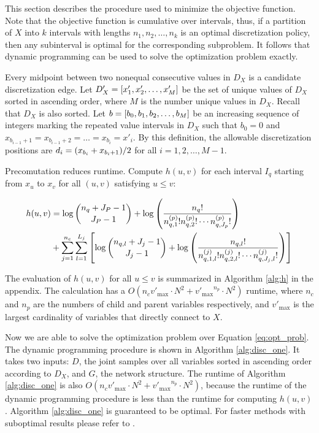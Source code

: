 This section describes the procedure used to minimize the objective function.
Note that the objective function is cumulative over intervals, thus, if a partition of $X$ into $k$ intervals with lengths $n_1,n_2,\ldots,n_k$ is an optimal discretization policy, then any subinterval is optimal for the corresponding subproblem.
It follows that dynamic programming can be used to solve the optimization problem exactly.

Every midpoint between two nonequal consecutive values in $D_X$ is a candidate discretization edge.
Let ${D'_X} = \brock{x'_1,x'_2,\ldots,x'_M}$ be the set of unique values of $D_X$ sorted in ascending order, where $M$ is the number unique values in $D_X$.
Recall that $D_X$ is also sorted.
Let $b = \brock{b_0,b_1,b_2,\ldots,b_M}$ be an increasing sequence of integers marking the repeated value intervals in $D_X$ such that $b_0 = 0$ and $x_{b_{i-1} + 1} = x_{b_{i-1} + 2} = \ldots = x_{b_i} = x'_i$.
By this definition, the allowable discretization positions are $d_i = \paren{x_{b_{i}} + x_{{b_i}+1}}/2$ for all $i = 1,2,\ldots,M-1$.

Precomutation reduces runtime.
Compute $h(u,v)$ for each interval $I_q$ starting from $x_{u}$ to $x_{v}$ for all $(u,v)$ satisfying $u \leq v$:

\begin{small}
\begin{equation}
\begin{aligned}
h(u,v) &=  \log {{n_{q} + J_P - 1}\choose{J_P-1}} + \log \left( { {{n_q}!}\over{ {n^{(p)}_{q,1} !} {n^{(p)}_{q,2} !} \cdots {n^{(p)}_{q,J_p} !}} } \right) \\
& + \sum_{j=1}^{n_c} \sum_{l=1}^{L_j} \left[  \log{{n_{q,l} + J_j - 1}\choose{J_j-1}} + \log \left( { {{n_{q,l}}!}\over{ {n^{(j)}_{q,1,l} !} {n^{(j)}_{q,2,l} !} \cdots {n^{(j)}_{q,J_j,l} !}} } \right) \right]
\end{aligned}
\end{equation}
\end{small}

The evaluation of $h(u,v)$ for all $u \leq v$ is summarized in Algorithm \ref{alg:h} in the appendix.
The calculation has a $O(n_c  {v'_\text{max}} \cdot N^2 + {v'_\text{max}}^{n_p} \cdot N^2)$ runtime, where $n_c$ and $n_p$ are the numbers of child and parent variables respectively, and $v'_\text{max}$ is the largest cardinality of variables that directly connect to $X$.

Now we are able to solve the optimization problem over Equation \ref{eq:opt_prob}.
The dynamic programming procedure is shown in Algorithm \ref{alg:disc_one}.
It takes two inputs: $D$, the joint samples over all variables sorted in ascending order according to $D_X$, and $G$, the network structure.
The runtime of Algorithm \ref{alg:disc_one} is also $O(n_c  {v'_\text{max}} \cdot N^2 + {v'_\text{max}}^{n_p} \cdot N^2)$, because the runtime of the dynamic programming procedure is less than the runtime for computing $h(u,v)$.
Algorithm \ref{alg:disc_one} is guaranteed to be optimal.
For faster methods with suboptimal results please refer to \citep{Boulle_2006}.

